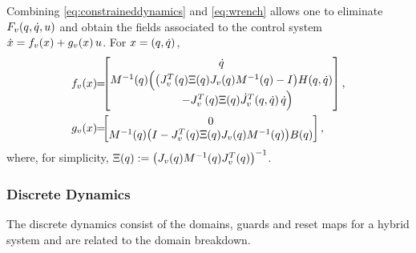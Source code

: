 %
Combining \eqref{eq:constraineddynamics} and \eqref{eq:wrench} allows one to eliminate $F_{v}(q, \dot{q}, u)$ and obtain the fields associated to the control system ${\dot {x}} = f_{v}(x) + g_{v}(x) \, u$. For $x = (q, \dot{q})$,
%
\begin{align}
  f_{v}\arx \!\! &= \!\!\! \left[\!\!\!\begin{array}{c}
    \dq\\
    \M^{-1}\argsq\Big( \big(J_{v}^{T}\argsq \Xi\argsq J_{v}\argsq \M^{-1}\argsq - I \big) \HCor\argsqdq \\
    \hspace{1cm}- J_{v}^{T}\argsq \Xi\argsq {\dot J}_{v}^{T}\argsqdq \, \dq \Big)
    \end{array}\!\!\!\right],\\
  \label{eq:controlsystem}
  g_{v}\arx \!\! &= \!\!\! \left[\!\!\!\begin{array}{c}
    0\\
    \M^{-1}\argsq \big(I - J_{v}^{T}\argsq \Xi\argsq J_{v}\argsq \M^{-1}\argsq \big) \B\argsq
    \end{array}\!\!\!\right],
\end{align}
%
where, for simplicity, $\Xi(q) := \big( J_{v}(q) M^{-1}(q) J_{v}^{T}(q) \big)^{-1}$.


\subsubsection{Discrete Dynamics}

The discrete dynamics consist of the domains, guards and reset maps for a hybrid
system and are related to the domain breakdown.


